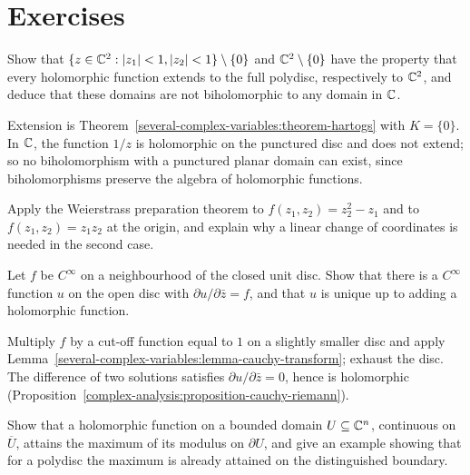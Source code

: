 \section{Exercises}\label{several-complex-variables:section-exercises}

\begin{exercise}\label{several-complex-variables:exercise-hartogs-domain}
Show that $\{z \in \mathbb{C}^2 : |z_1| < 1, |z_2| < 1\} \setminus \{0\}$ and $\mathbb{C}^2 \setminus \{0\}$ have the property that every holomorphic function extends to the full polydisc, respectively to $\mathbb{C}^2$, and
deduce that these domains are not biholomorphic to any domain in $\mathbb{C}$.
\end{exercise}

\begin{solution}
Extension is Theorem~\ref{several-complex-variables:theorem-hartogs} with $K = \{0\}$. In $\mathbb{C}$, the function $1/z$ is holomorphic on the punctured disc and does not extend; so no biholomorphism with a
punctured planar domain can exist, since biholomorphisms preserve the algebra of holomorphic functions.
\end{solution}

\begin{exercise}\label{several-complex-variables:exercise-weierstrass-example}
Apply the Weierstrass preparation theorem to $f(z_1, z_2) = z_2^2 - z_1$ and to $f(z_1, z_2) = z_1z_2$ at the origin, and explain why a linear change of coordinates is needed in the second case.
\end{exercise}

\begin{exercise}\label{several-complex-variables:exercise-dbar-one-variable}
Let $f$ be $C^\infty$ on a neighbourhood of the closed unit disc. Show that there is a $C^\infty$ function $u$ on the open disc with $\partial u/\partial\bar z = f$, and that $u$ is unique up to adding a
holomorphic function.
\end{exercise}

\begin{solution}
Multiply $f$ by a cut-off function equal to $1$ on a slightly smaller disc and apply Lemma~\ref{several-complex-variables:lemma-cauchy-transform}; exhaust the disc. The difference of two solutions satisfies
$\partial u/\partial\bar z = 0$, hence is holomorphic (Proposition~\ref{complex-analysis:proposition-cauchy-riemann}).
\end{solution}

\begin{exercise}\label{several-complex-variables:exercise-maximum-principle-boundary}
Show that a holomorphic function on a bounded domain $U \subseteq \mathbb{C}^n$, continuous on $\overline{U}$, attains the maximum of its modulus on $\partial U$, and give an example showing that for a polydisc
the maximum is already attained on the distinguished boundary.
\end{exercise}
